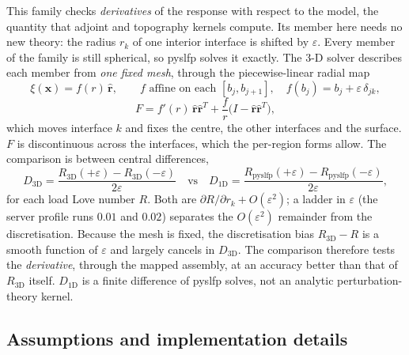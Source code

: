 \documentclass[11pt]{article}
\numberwithin{equation}{section}
\newcommand{\eps}{\varepsilon}
\newcommand{\vx}{\mathbf{x}}
\newcommand{\rhat}{\hat{\mathbf{r}}}
\begin{document}
This family checks \emph{derivatives} of the response with respect to the
model, the quantity that adjoint and topography kernels compute. Its
member here needs no new theory: the radius $r_k$ of one interior interface is
shifted by $\eps$. Every member of the family is still spherical, so
pyslfp solves it exactly. The 3-D solver describes each member from
\emph{one fixed mesh}, through the piecewise-linear radial map
\begin{equation}
  \xi(\vx) = f(r)\,\rhat,\qquad f \text{ affine on each } [b_j,b_{j+1}],\quad
  f(b_j) = b_j + \eps\,\delta_{jk},
  \label{eq:shift}
\end{equation}
\begin{equation*}
  F = f'(r)\,\rhat\rhat^T + \frac{f}{r}\bigl(I-\rhat\rhat^T\bigr),
\end{equation*}
which moves interface $k$ and fixes the centre, the other interfaces and
the surface. $F$ is discontinuous across the interfaces, which the
per-region forms allow. The comparison is between central differences,
\begin{equation}
  D_{3\text{D}} = \frac{R_{3\text{D}}(+\eps)-R_{3\text{D}}(-\eps)}{2\eps}
  \quad\text{vs}\quad
  D_{1\text{D}} = \frac{R_{\text{pyslfp}}(+\eps)-R_{\text{pyslfp}}(-\eps)}{2\eps},
  \label{eq:fd}
\end{equation}
for each load Love number $R$. Both are $\partial R/\partial r_k+O(\eps^2)$;
a ladder in $\eps$ (the server profile runs $0.01$ and $0.02$) separates
the $O(\eps^2)$ remainder from the discretisation. Because the mesh is
fixed, the discretisation bias $R_{3\text{D}}-R$ is a smooth function of
$\eps$ and largely cancels in $D_{3\text{D}}$. The comparison therefore
tests the \emph{derivative}, through the mapped assembly, at an accuracy
better than that of $R_{3\text{D}}$ itself. $D_{1\text{D}}$ is a finite
difference of pyslfp solves, not an analytic perturbation-theory kernel.

\subsection{Assumptions and implementation details}
\end{document}
